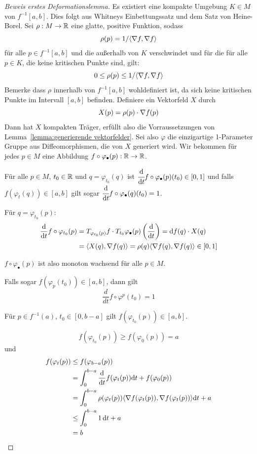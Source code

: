 \begin{proof}[Beweis erstes Deformationslemma]
    Es existiert eine kompakte Umgebung $K \in M$ von $f^{-1}[a, b]$. Dies folgt
    aus Whitneys Einbettungssatz und dem Satz von Heine-Borel.
    Sei $\rho: M \to { \mathbb R }$ eine glatte, positive Funktion, sodass
    \[ \rho(p) = 1 / \langle { \nabla } f, { \nabla } f \rangle \]
    für alle $p \in f^{-1}[a, b]$ und die außerhalb von $K$ verschwindet und für
    die für alle $p \in K$, die keine kritischen Punkte sind, gilt: 
    \[ 0 \leq \rho(p) \leq 1 / \langle { \nabla } f, { \nabla } f \rangle \]
    Bemerke dass $\rho$ innerhalb von $f^{-1}[a, b]$ wohldefiniert 
    ist, da sich keine kritischen Punkte im Intervall $[a, b]$ befinden. 
    Definiere ein Vektorfeld $X$ durch
    \[ X(p) = \rho(p) \cdot { \nabla } f (p) \]
    Dann hat $X$ kompakten Träger, erfüllt also die Vorraussetzungen von 
    Lemma~\ref{lemma:generierende vektorfelder}. Sei also $\varphi$ die
    einzigartige 1-Parameter Gruppe aus Diffeomorphismen, die von $X$ generiert
    wird. 
    Wir bekommen für jedes $p \in M$ eine Abbildung 
    $f \circ \varphi_{\bullet}(p): { \mathbb R } \to { \mathbb R }$.
    
     Für alle $p \in M$, $t_0 \in { \mathbb R }$ und $q = \varphi_{t_0}(q)$
    ist $\derive{t} f \circ \varphi_{\bullet}(p) (t_0) \in [0, 1]$ und falls $f(\varphi_t(q)) \in [a, b]$
    gilt sogar $\derive{t} f \circ \varphi_{\bullet}(q) (t_0) = 1$.

    Für $q = \varphi_{t_0}(p)$:
    \begin{align*}
        \derive{t} f \circ \varphi_{t_0}(p)
        & = T_{\varphi_{t_0}(p)} f \cdot T_{t_0}\varphi_{\bullet}(p) \left( \derive{t} \right)
        = \opd f (q) \cdot X(q) \\
        & = \langle X(q), \grad f (q) \rangle 
        = \rho(q) \langle \grad f (q), \grad f (q) \rangle \in [0, 1]
    \end{align*}
    
    $f \circ \varphi_{\bullet}(p)$ ist also monoton wachsend für alle $p \in M$.

    Falls sogar $f(\varphi_p(t_0)) \in [a, b]$, dann gilt
    \[ \frac{d}{dt} f \circ \varphi^p (t_0) = 1 \]
    \sectiondone

     Für $p \in f^{-1}(a)$, $t_0 \in [0, b-a]$ gilt $f(\varphi_{t_0}(p)) \in [a, b]$.
    
    \[ f(\varphi_{t_0}(p)) \geq f(\varphi_0(p)) = a \]
    und
    \begin{align*}
        f(\varphi_t(p)) 
        & \leq f(\varphi_{b-a}(p)) \\
        & = \int_0^{b-a}\derive{t} f(\varphi_t(p)) \opd t + f(\varphi_0(p)) \\
        & = \int_0^{b-a}\rho(\varphi_t(p)) \langle \grad f (\varphi_t(p)), \grad f (\varphi_t(p)) \rangle \opd t + a \\
        & \leq \int_0^{b-a} 1 \, \opd t + a \\
        & = b
    \end{align*}
    \sectiondone


\end{proof}
